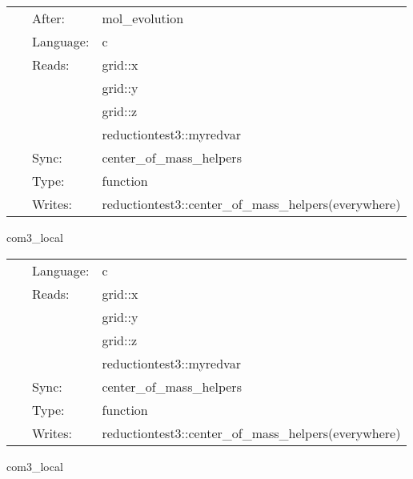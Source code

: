 \hspace{5mm}

 \begin{tabular*}{160mm}{cll} 
~ & After:  & mol\_evolution \\ 
~ & Language:  & c \\ 
~ & Reads:  & grid::x \\ 
~& ~ &grid::y\\ 
~& ~ &grid::z\\ 
~& ~ &reductiontest3::myredvar\\ 
~ & Sync:  & center\_of\_mass\_helpers \\ 
~ & Type:  & function \\ 
~ & Writes:  & reductiontest3::center\_of\_mass\_helpers(everywhere) \\ 
\end{tabular*} 


\vspace{5mm}


\hspace{5mm} com3\_local 

\hspace{5mm}{\it setup integrands for com calculation } 


\hspace{5mm}

 \begin{tabular*}{160mm}{cll} 
~ & Language:  & c \\ 
~ & Reads:  & grid::x \\ 
~& ~ &grid::y\\ 
~& ~ &grid::z\\ 
~& ~ &reductiontest3::myredvar\\ 
~ & Sync:  & center\_of\_mass\_helpers \\ 
~ & Type:  & function \\ 
~ & Writes:  & reductiontest3::center\_of\_mass\_helpers(everywhere) \\ 
\end{tabular*} 


\vspace{5mm}


\hspace{5mm} com3\_local 

\hspace{5mm}{\it setup integrands for com calculation } 


\hspace{5mm}

